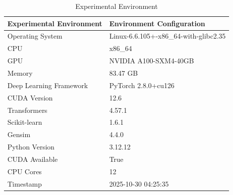 \begin{table}
\caption{Experimental Environment}
\label{tab:env}
\begin{tabular}{ll}
\toprule
Experimental Environment & Environment Configuration \\
\midrule
Operating System & Linux-6.6.105+-x86_64-with-glibc2.35 \\
CPU & x86_64 \\
GPU & NVIDIA A100-SXM4-40GB \\
Memory & 83.47 GB \\
Deep Learning Framework & PyTorch 2.8.0+cu126 \\
CUDA Version & 12.6 \\
Transformers & 4.57.1 \\
Scikit-learn & 1.6.1 \\
Gensim & 4.4.0 \\
Python Version & 3.12.12 \\
CUDA Available & True \\
CPU Cores & 12 \\
Timestamp & 2025-10-30 04:25:35 \\
\bottomrule
\end{tabular}
\end{table}
